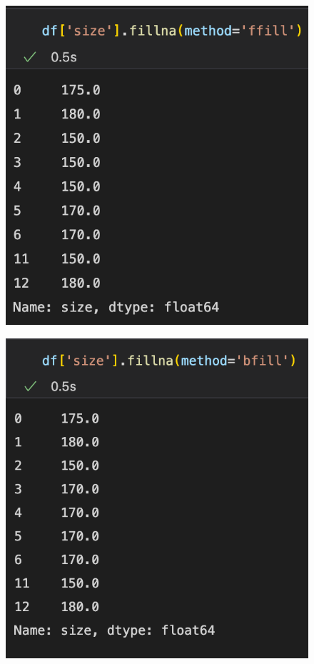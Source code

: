\begin{frame}
      \begin{minipage}{0.35\linewidth}
      \begin{figure}[H]
         \includegraphics[scale=.35]{../images/illustrations/data_cleaning_na_imputation_ffill.png}
      \end{figure}
   \end{minipage}
   \begin{minipage}{0.3\linewidth}
      \begin{figure}[H]
         \includegraphics[scale=.35]{../images/illustrations/data_cleaning_na_imputation_bfill.png}
      \end{figure}
   \end{minipage}
      

\end{frame}
